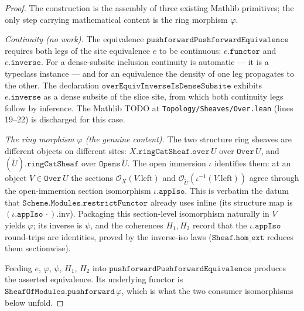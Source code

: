 \begin{proof}

\leanok
  The construction is the assembly of three existing Mathlib primitives; the only
  step carrying mathematical content is the ring morphism \(\varphi\).

  \emph{Continuity (no work).} The equivalence
  \(\mathtt{pushforwardPushforwardEquivalence}\) requires both legs of the site
  equivalence \(e\) to be continuous:
  \(e.\mathtt{functor}\) and \(e.\mathtt{inverse}\). For a dense-subsite inclusion
  continuity is automatic --- it is a typeclass instance --- and for an
  equivalence the density of one leg propagates to the other. The declaration
  \(\mathtt{overEquivInverseIsDenseSubsite}\) exhibits \(e.\mathtt{inverse}\) as a
  dense subsite of the slice site, from which both continuity legs follow by
  inference. The Mathlib TODO at \texttt{Topology/Sheaves/Over.lean} (lines 19--22)
  is discharged for this case.

  \emph{The ring morphism \(\varphi\) (the genuine content).} The two structure
  ring sheaves are different objects on different sites:
  \(X.\mathtt{ringCatSheaf}.\mathtt{over}\,U\) over \(\mathtt{Over}\,U\), and
  \((\widetilde{U}).\mathtt{ringCatSheaf}\) over \(\mathtt{Opens}\,\widetilde{U}\).
  The open immersion \(\iota\) identifies them: at an object \(V \in
  \mathtt{Over}\,U\) the sections \(\mathcal{O}_X(V.\mathrm{left})\) and
  \(\mathcal{O}_{\widetilde{U}}(\iota^{-1}(V.\mathrm{left}))\) agree through the
  open-immersion section isomorphism \(\iota.\mathtt{appIso}\). This is verbatim the
  datum that \(\mathtt{Scheme.Modules.restrictFunctor}\) already uses inline
  (its structure map is \((\iota.\mathtt{appIso}\,\cdot).\mathrm{inv}\)). Packaging
  this section-level isomorphism naturally in \(V\) yields \(\varphi\); its inverse
  is \(\psi\), and the coherences \(H_1, H_2\) record that the
  \(\iota.\mathtt{appIso}\) round-trips are identities, proved by the
  inverse-iso laws (\(\mathtt{Sheaf.hom\_ext}\) reduces them sectionwise).

  Feeding \(e\), \(\varphi\), \(\psi\), \(H_1\), \(H_2\) into
  \(\mathtt{pushforwardPushforwardEquivalence}\) produces the asserted equivalence.
  Its underlying functor is \(\mathtt{SheafOfModules.pushforward}\,\varphi\), which
  is what the two consumer isomorphisms below unfold.
\end{proof}

